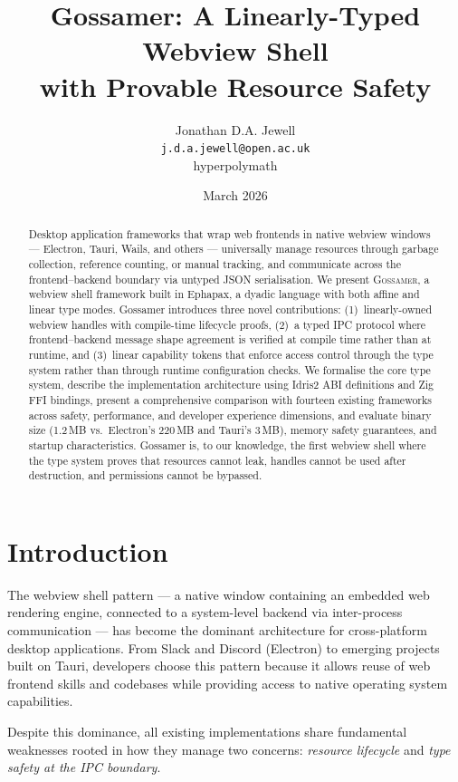 \documentclass[11pt,a4paper]{article}
\title{Gossamer: A Linearly-Typed Webview Shell\\with Provable Resource Safety}
\author{
  Jonathan D.A. Jewell\\
  \texttt{j.d.a.jewell@open.ac.uk}\\
  hyperpolymath
}
\date{March 2026}
\theoremstyle{definition}
\begin{document}
\maketitle

\begin{abstract}
Desktop application frameworks that wrap web frontends in native webview
windows --- Electron, Tauri, Wails, and others --- universally manage
resources through garbage collection, reference counting, or manual
tracking, and communicate across the frontend--backend boundary via
untyped JSON serialisation. We present \textsc{Gossamer}, a webview
shell framework built in Ephapax, a dyadic language with both affine
and linear type modes. Gossamer introduces three novel contributions:
(1)~linearly-owned webview handles with compile-time lifecycle proofs,
(2)~a typed IPC protocol where frontend--backend message shape agreement
is verified at compile time rather than at runtime, and
(3)~linear capability tokens that enforce access control through the
type system rather than through runtime configuration checks.
We formalise the core type system, describe the implementation
architecture using Idris2 ABI definitions and Zig FFI bindings,
present a comprehensive comparison with fourteen existing frameworks
across safety, performance, and developer experience dimensions,
and evaluate binary size (1.2\,MB vs.\ Electron's 220\,MB and
Tauri's 3\,MB), memory safety guarantees, and startup characteristics.
Gossamer is, to our knowledge, the first webview shell where the type
system proves that resources cannot leak, handles cannot be used after
destruction, and permissions cannot be bypassed.
\end{abstract}

\section{Introduction}
\label{sec:intro}

The webview shell pattern --- a native window containing an embedded
web rendering engine, connected to a system-level backend via
inter-process communication --- has become the dominant architecture
for cross-platform desktop applications. From Slack and Discord
(Electron) to emerging projects built on Tauri, developers choose this
pattern because it allows reuse of web frontend skills and codebases
while providing access to native operating system capabilities.

Despite this dominance, all existing implementations share fundamental
weaknesses rooted in how they manage two concerns: \emph{resource
lifecycle} and \emph{type safety at the IPC boundary}.
\end{document}
